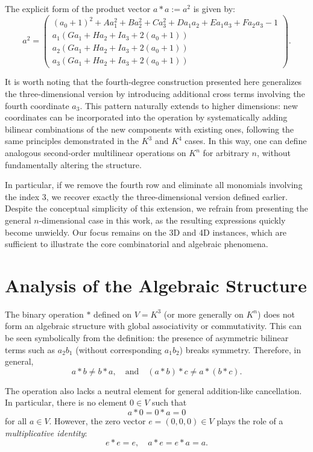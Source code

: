 \documentclass[12pt]{article}
\theoremstyle{definition}
\theoremstyle{plain}
\theoremstyle{remark}
\begin{document}
The explicit form of the product vector \( a * a := a^2 \) is given by:
\[
a^2 =
\begin{pmatrix}
(a_0 + 1)^2 + A a^2_1 + B a^2_2 + C a^2_3 + D a_1 a_2 + E a_1 a_3 + F a_2 a_3 - 1 \\
a_1 (G a_1 + H a_2 + I a_3 + 2 (a_0 + 1)) \\
a_2 (G a_1 + H a_2 + I a_3 + 2 (a_0 + 1)) \\
a_3 (G a_1 + H a_2 + I a_3 + 2 (a_0 + 1))
\end{pmatrix}.
\]

It is worth noting that the fourth-degree construction presented here generalizes the three-dimensional version by introducing additional cross terms involving the fourth coordinate \( a_3 \). This pattern naturally extends to higher dimensions: new coordinates can be incorporated into the operation by systematically adding bilinear combinations of the new components with existing ones, following the same principles demonstrated in the \( K^3 \) and \( K^4 \) cases. In this way, one can define analogous second-order multilinear operations on \( K^n \) for arbitrary \( n \), without fundamentally altering the structure.

In particular, if we remove the fourth row and eliminate all monomials involving the index 3, we recover exactly the three-dimensional version defined earlier. Despite the conceptual simplicity of this extension, we refrain from presenting the general \( n \)-dimensional case in this work, as the resulting expressions quickly become unwieldy. Our focus remains on the 3D and 4D instances, which are sufficient to illustrate the core combinatorial and algebraic phenomena.

\section{Analysis of the Algebraic Structure}

The binary operation \( * \) defined on \( V = K^3 \) (or more generally on \( K^n \)) does not form an algebraic structure with global associativity or commutativity. This can be seen symbolically from the definition: the presence of asymmetric bilinear terms such as \( a_2 b_1 \) (without corresponding \( a_1 b_2 \)) breaks symmetry. Therefore, in general,
\[
a * b \ne b * a, \quad \text{and} \quad (a * b) * c \ne a * (b * c).
\]

The operation also lacks a neutral element for general addition-like cancellation. In particular, there is no element \( 0 \in V \) such that
\[
a * 0 = 0 * a = 0
\]
for all \( a \in V \). However, the zero vector \( e = (0, 0, 0) \in V \) plays the role of a \emph{multiplicative identity}:
\[
e * e = e, \quad a * e = e * a = a.
\]
\end{document}
